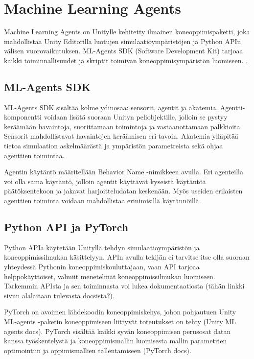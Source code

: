 \documentclass[utf8]{gradu3}
\begin{document}
\section{Machine Learning Agents}

Machine Learning Agents on Unitylle kehitetty ilmainen koneoppimispaketti, joka mahdollistaa Unity Editorilla luotujen simulaatioympäristöjen ja Python APIn välisen vuorovaikutuksen. ML-Agents SDK (Software Development Kit) tarjoaa kaikki toiminnallisuudet ja skriptit toimivan koneoppimisympäristön luomiseen. \parencite{juliani2018unity}.

\subsection{ML-Agents SDK}

ML-Agents SDK sisältää kolme ydinosaa: sensorit, agentit ja akatemia. Agentti-komponentti voidaan lisätä suoraan Unityn peliobjektille, jolloin se pystyy keräämään havaintoja, suorittamaan toimintoja ja vastaanottamaan palkkioita. Sensorit mahdollistavat havaintojen keräämisen eri tavoin. Akatemia ylläpitää tietoa simulaation askelmäärästä ja ympäristön parametreista sekä ohjaa agenttien toimintaa.

Agentin käytäntö määritellään Behavior Name -nimikkeen avulla. Eri agenteilla voi olla sama käytäntö, jolloin agentit käyttävät kyseistä käytäntöä päätöksentekoon ja jakavat harjoitteludatan keskenään. Myös useiden erilaisten agenttien toiminta voidaan mahdollistaa erinimisillä käytännöillä.

\subsection{Python API ja PyTorch}

Python APIa käytetään Unityllä tehdyn simulaatioympäristön ja koneoppimissilmukan käsittelyyn. APIn avulla tekijän ei tarvitse itse olla suoraan yhteydessä Pythonin koneoppimiskouluttajaan, vaan API tarjoaa helppokäyttöiset, valmiit menetelmät koneoppimissilmukan luomiseen. Tarkemmin APIsta ja sen toiminnasta voi lukea dokumentaatiosta (tähän linkki sivun alalaitaan tulevasta docsista?).

PyTorch on avoimen lähdekoodin koneoppimiskehys, johon pohjautuen Unity ML-agents -paketin koneoppimiseen liittyvät toteutukset on tehty (Unity ML agents docs). PyTorch sisältää kaikki syvän koneoppimisen perusosat datan kanssa työskentelystä ja koneoppimismallin luomisesta mallin parametrien optimointiin ja oppimismallien tallentamiseen (PyTorch docs).
\end{document}
